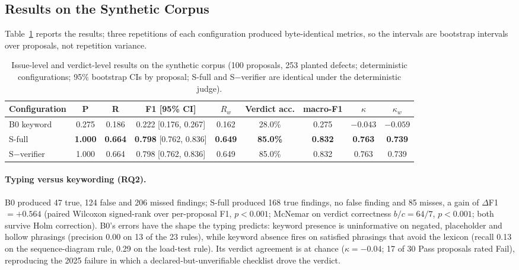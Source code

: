 \documentclass{IOS-Book-Article}
\begin{document}
\subsection{Results on the Synthetic Corpus}

Table~\ref{tab:results} reports the results; three repetitions of each configuration produced byte-identical metrics, so the intervals are bootstrap intervals over proposals, not repetition variance.

\begin{table}[t]
\caption{Issue-level and verdict-level results on the synthetic corpus (100 proposals, 253 planted defects; deterministic configurations; 95\% bootstrap CIs by proposal; S-full and S$-$verifier are identical under the deterministic judge).}
\label{tab:results}
\centering
\scriptsize
\setlength{\tabcolsep}{2.5pt}
\begin{tabular}{@{}lcccccccc@{}}
\toprule
Configuration & P & R & F1 [95\% CI] & $R_w$ & Verdict acc. & macro-F1 & $\kappa$ & $\kappa_w$ \\
\midrule
B0 keyword & 0.275 & 0.186 & 0.222 [0.176, 0.267] & 0.162 & 28.0\% & 0.275 & $-0.043$ & $-0.059$ \\
S-full & \textbf{1.000} & \textbf{0.664} & \textbf{0.798} [0.762, 0.836] & \textbf{0.649} & \textbf{85.0\%} & \textbf{0.832} & \textbf{0.763} & \textbf{0.739} \\
S$-$verifier & 1.000 & 0.664 & 0.798 [0.762, 0.836] & 0.649 & 85.0\% & 0.832 & 0.763 & 0.739 \\
\bottomrule
\end{tabular}
\end{table}

\paragraph{Typing versus keywording (RQ2).}
B0 produced 47 true, 124 false and 206 missed findings; S-full produced 168 true findings, no false finding and 85 misses, a gain of $\Delta$F1 $=+0.564$ (paired Wilcoxon signed-rank over per-proposal F1, $p<0.001$; McNemar on verdict correctness $b/c=64/7$, $p<0.001$; both survive Holm correction). B0's errors have the shape the typing predicts: keyword presence is uninformative on negated, placeholder and hollow phrasings (precision 0.00 on 13 of the 23 rules), while keyword absence fires on satisfied phrasings that avoid the lexicon (recall 0.13 on the sequence-diagram rule, 0.29 on the load-test rule). Its verdict agreement is at chance ($\kappa=-0.04$; 17 of 30 Pass proposals rated Fail), reproducing the 2025 failure in which a declared-but-unverifiable checklist drove the verdict.
\end{document}
